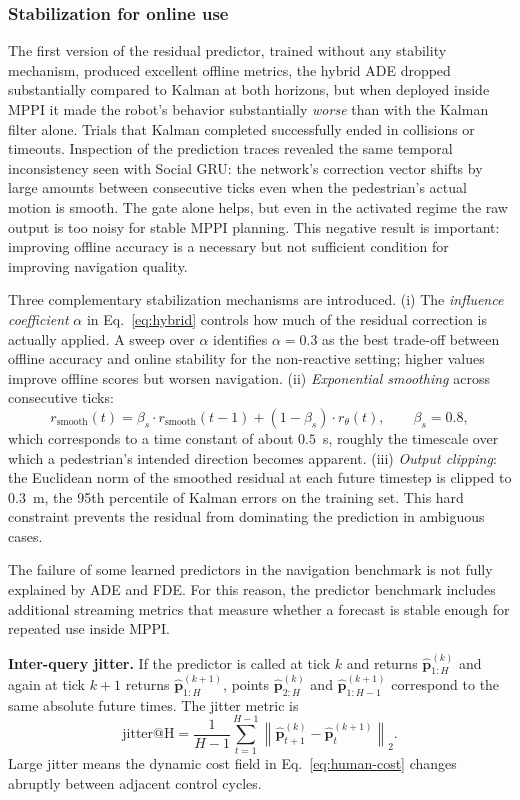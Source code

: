 \documentclass[12pt, a4paper]{article}
\begin{document}
\subsubsection{Stabilization for online use}
\label{sec:stabilization}

The first version of the residual predictor, trained without any stability mechanism, produced excellent offline metrics, the hybrid ADE dropped substantially compared to Kalman at both horizons, but when deployed inside MPPI it made the robot's behavior substantially \emph{worse} than with the Kalman filter alone. Trials that Kalman completed successfully ended in collisions or timeouts. Inspection of the prediction traces revealed the same temporal inconsistency seen with Social GRU: the network's correction vector shifts by large amounts between consecutive ticks even when the pedestrian's actual motion is smooth. The gate alone helps, but even in the activated regime the raw output is too noisy for stable MPPI planning. This negative result is important: improving offline accuracy is a necessary but not sufficient condition for improving navigation quality.

Three complementary stabilization mechanisms are introduced. (i) The \emph{influence coefficient} $\alpha$ in Eq.~\eqref{eq:hybrid} controls how much of the residual correction is actually applied. A sweep over $\alpha$ identifies $\alpha=0.3$ as the best trade-off between offline accuracy and online stability for the non-reactive setting; higher values improve offline scores but worsen navigation. (ii) \emph{Exponential smoothing} across consecutive ticks:
\[
r_{\text{smooth}}(t) = \beta_s\cdot r_{\text{smooth}}(t-1) + (1-\beta_s)\cdot r_\theta(t),
\qquad \beta_s=0.8,
\]
which corresponds to a time constant of about $0.5$~s, roughly the timescale over which a pedestrian's intended direction becomes apparent. (iii) \emph{Output clipping}: the Euclidean norm of the smoothed residual at each future timestep is clipped to $0.3$~m, the 95th percentile of Kalman errors on the training set. This hard constraint prevents the residual from dominating the prediction in ambiguous cases.

The failure of some learned predictors in the navigation benchmark is not fully explained by ADE and FDE. For this reason, the predictor benchmark includes additional streaming metrics that measure whether a forecast is stable enough for repeated use inside MPPI.

\textbf{Inter-query jitter.} If the predictor is called at tick $k$ and returns $\hat{\mathbf{p}}^{(k)}_{1:H}$ and again at tick $k+1$ returns $\hat{\mathbf{p}}^{(k+1)}_{1:H}$, points $\hat{\mathbf{p}}^{(k)}_{2:H}$ and $\hat{\mathbf{p}}^{(k+1)}_{1:H-1}$ correspond to the same absolute future times. The jitter metric is
\[
\mathrm{jitter@H}
=
\frac{1}{H-1}\sum_{t=1}^{H-1}
\left\|
\hat{\mathbf{p}}^{(k)}_{t+1}
-
\hat{\mathbf{p}}^{(k+1)}_{t}
\right\|_2.
\]
Large jitter means the dynamic cost field in Eq.~\eqref{eq:human-cost} changes abruptly between adjacent control cycles.
\end{document}
